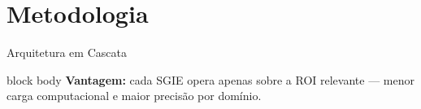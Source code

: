 
\section{Metodologia}

\begin{frame}{Arquitetura em Cascata}
  \vspace{-2mm}
  \begin{center}
    \resizebox{0.90\textwidth}{!}{}
  \end{center}

  \vspace{-1mm}

  \begin{center}
  \end{center}

  \vspace{-1mm}

  \begin{beamercolorbox}[wd=\textwidth, rounded=true, shadow=false]{block body}
    \centering
    {\footnotesize\color{stagecolor}%
      \textbf{Vantagem:} cada SGIE opera apenas sobre a ROI relevante --- menor carga computacional e maior precisão por domínio.}
  \end{beamercolorbox}
  \vfill
\end{frame}

